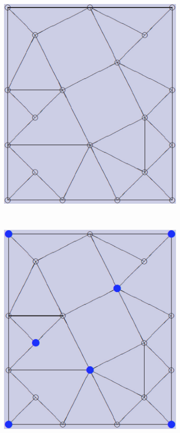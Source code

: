 \documentclass[12pt]{article}
\begin{document}
\begin{figure}[tb]
\begin{subfigure}[b]{0.2\textwidth}
      \caption{}\label{fig:contract_kernel4}
  \end{subfigure}

  \begin{subfigure}[b]{0.2\textwidth}
      \includegraphics[width=\textwidth]{img/contract_kernel6}
      \caption{}\label{fig:contract_kernel5}
  \end{subfigure}~%
  \begin{subfigure}[b]{0.2\textwidth}
      \includegraphics[width=\textwidth]{img/contract_kernel7}

\end{subfigure}
\end{figure}
\end{document}
